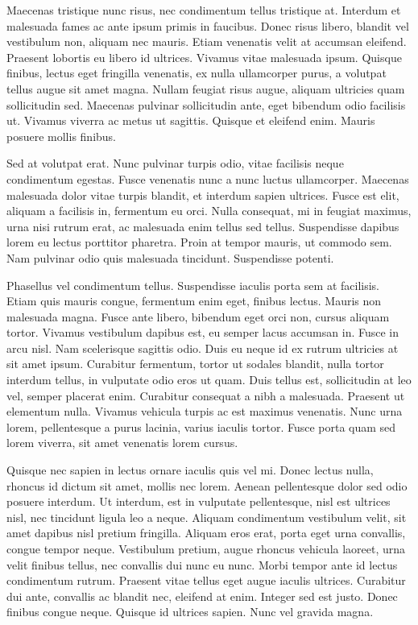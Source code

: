 Maecenas tristique nunc risus, nec condimentum tellus tristique at. Interdum et malesuada fames ac ante ipsum primis in faucibus. Donec risus libero, blandit vel vestibulum non, aliquam nec mauris. Etiam venenatis velit at accumsan eleifend. Praesent lobortis eu libero id ultrices. Vivamus vitae malesuada ipsum. Quisque finibus, lectus eget fringilla venenatis, ex nulla ullamcorper purus, a volutpat tellus augue sit amet magna. Nullam feugiat risus augue, aliquam ultricies quam sollicitudin sed. Maecenas pulvinar sollicitudin ante, eget bibendum odio facilisis ut. Vivamus viverra ac metus ut sagittis. Quisque et eleifend enim. Mauris posuere mollis finibus.

Sed at volutpat erat. Nunc pulvinar turpis odio, vitae facilisis neque condimentum egestas. Fusce venenatis nunc a nunc luctus ullamcorper. Maecenas malesuada dolor vitae turpis blandit, et interdum sapien ultrices. Fusce est elit, aliquam a facilisis in, fermentum eu orci. Nulla consequat, mi in feugiat maximus, urna nisi rutrum erat, ac malesuada enim tellus sed tellus. Suspendisse dapibus lorem eu lectus porttitor pharetra. Proin at tempor mauris, ut commodo sem. Nam pulvinar odio quis malesuada tincidunt. Suspendisse potenti.

Phasellus vel condimentum tellus. Suspendisse iaculis porta sem at facilisis. Etiam quis mauris congue, fermentum enim eget, finibus lectus. Mauris non malesuada magna. Fusce ante libero, bibendum eget orci non, cursus aliquam tortor. Vivamus vestibulum dapibus est, eu semper lacus accumsan in. Fusce in arcu nisl. Nam scelerisque sagittis odio. Duis eu neque id ex rutrum ultricies at sit amet ipsum. Curabitur fermentum, tortor ut sodales blandit, nulla tortor interdum tellus, in vulputate odio eros ut quam. Duis tellus est, sollicitudin at leo vel, semper placerat enim. Curabitur consequat a nibh a malesuada. Praesent ut elementum nulla. Vivamus vehicula turpis ac est maximus venenatis. Nunc urna lorem, pellentesque a purus lacinia, varius iaculis tortor. Fusce porta quam sed lorem viverra, sit amet venenatis lorem cursus.

Quisque nec sapien in lectus ornare iaculis quis vel mi. Donec lectus nulla, rhoncus id dictum sit amet, mollis nec lorem. Aenean pellentesque dolor sed odio posuere interdum. Ut interdum, est in vulputate pellentesque, nisl est ultrices nisl, nec tincidunt ligula leo a neque. Aliquam condimentum vestibulum velit, sit amet dapibus nisl pretium fringilla. Aliquam eros erat, porta eget urna convallis, congue tempor neque. Vestibulum pretium, augue rhoncus vehicula laoreet, urna velit finibus tellus, nec convallis dui nunc eu nunc. Morbi tempor ante id lectus condimentum rutrum. Praesent vitae tellus eget augue iaculis ultrices. Curabitur dui ante, convallis ac blandit nec, eleifend at enim. Integer sed est justo. Donec finibus congue neque. Quisque id ultrices sapien. Nunc vel gravida magna.

